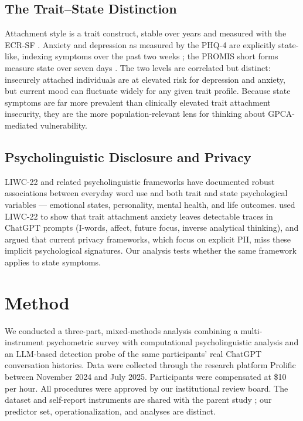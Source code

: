 \documentclass[letterpaper]{article}
\begin{document}
\subsection{The Trait--State Distinction}
Attachment style is a trait construct, stable over years and measured with the ECR-SF \citep{wei2007ecrsf,bartholomew1991styles}. Anxiety and depression as measured by the PHQ-4 are explicitly state-like, indexing symptoms over the past two weeks \citep{kroenke2009phq4}; the PROMIS short forms measure state over seven days \citep{pilkonis2011promis}. The two levels are correlated but distinct: insecurely attached individuals are at elevated risk for depression and anxiety, but current mood can fluctuate widely for any given trait profile. Because state symptoms are far more prevalent than clinically elevated trait attachment insecurity, they are the more population-relevant lens for thinking about GPCA-mediated vulnerability.

\subsection{Psycholinguistic Disclosure and Privacy}
LIWC-22 \citep{boyd2022liwc} and related psycholinguistic frameworks have documented robust associations between everyday word use and both trait and state psychological variables --- emotional states, personality, mental health, and life outcomes. \citet{anon2026attachment} used LIWC-22 to show that trait attachment anxiety leaves detectable traces in ChatGPT prompts (I-words, affect, future focus, inverse analytical thinking), and argued that current privacy frameworks, which focus on explicit PII, miss these implicit psychological signatures. Our analysis tests whether the same framework applies to state symptoms.

\section{Method}

We conducted a three-part, mixed-methods analysis combining a multi-instrument psychometric survey with computational psycholinguistic analysis and an LLM-based detection probe of the same participants' real ChatGPT conversation histories. Data were collected through the research platform Prolific between November 2024 and July 2025. Participants were compensated at \$10 per hour. All procedures were approved by our institutional review board. The dataset and self-report instruments are shared with the parent study \citep{anon2026attachment}; our predictor set, operationalization, and analyses are distinct.
\end{document}
